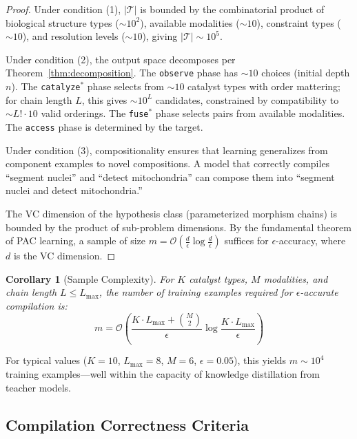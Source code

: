 \documentclass[11pt,a4paper]{article}
\newtheorem{corollary}[theorem]{Corollary}
\theoremstyle{definition}
\theoremstyle{remark}
\begin{document}
\begin{proof}
Under condition (1), $|\mathcal{T}|$ is bounded by the combinatorial product of biological structure types ($\sim 10^2$), available modalities ($\sim 10$), constraint types ($\sim 10$), and resolution levels ($\sim 10$), giving $|\mathcal{T}| \sim 10^5$.

Under condition (2), the output space decomposes per Theorem~\ref{thm:decomposition}. The \texttt{observe} phase has $\sim 10$ choices (initial depth $n$). The \texttt{catalyze}$^*$ phase selects from $\sim 10$ catalyst types with order mattering; for chain length $L$, this gives $\sim 10^L$ candidates, constrained by compatibility to $\sim L! \cdot 10$ valid orderings. The \texttt{fuse}$^*$ phase selects pairs from available modalities. The \texttt{access} phase is determined by the target.

Under condition (3), compositionality ensures that learning generalizes from component examples to novel compositions. A model that correctly compiles ``segment nuclei'' and ``detect mitochondria'' can compose them into ``segment nuclei and detect mitochondria.''

The VC dimension of the hypothesis class (parameterized morphism chains) is bounded by the product of sub-problem dimensions. By the fundamental theorem of PAC learning, a sample of size $m = \mathcal{O}(\frac{d}{\epsilon} \log \frac{d}{\epsilon})$ suffices for $\epsilon$-accuracy, where $d$ is the VC dimension.
\end{proof}

\begin{corollary}[Sample Complexity]
For $K$ catalyst types, $M$ modalities, and chain length $L \leq L_{\max}$, the number of training examples required for $\epsilon$-accurate compilation is:
\begin{equation}
m = \mathcal{O}\left(\frac{K \cdot L_{\max} + \binom{M}{2}}{\epsilon} \log \frac{K \cdot L_{\max}}{\epsilon}\right)
\end{equation}
\end{corollary}

For typical values ($K = 10$, $L_{\max} = 8$, $M = 6$, $\epsilon = 0.05$), this yields $m \sim 10^4$ training examples---well within the capacity of knowledge distillation from teacher models.

\subsection{Compilation Correctness Criteria}
\end{document}
